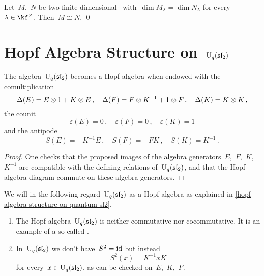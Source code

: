 \documentclass[a4paper, 11pt, oneside]{scrartcl}
\begin{document}
\begin{corollary}
  \label{decomposition from quantum weight spaces}
  Let~$M$,~$N$ be two finite-dimensional~ with~$\dim M_\lambda = \dim N_\lambda$ for every~$\lambda \in \kf^\times$.
  Then~$M \cong N$.
  \qed
\end{corollary}





\section{Hopf Algebra Structure on~$\operatorname{U}_q(\mathfrak{sl}_2)$}


\begin{proposition}
  \label{hopf algebra structure on quantum sl2}
  The algebra~$\operatorname{U}_q(\mathfrak{sl}_2)$ becomes a Hopf algebra when endowed with the comultiplication
  \[
    \Delta(E) = E \otimes 1 + K \otimes E \,,
    \quad
    \Delta(F) = F \otimes K^{-1} + 1 \otimes F \,,
    \quad
    \Delta(K) = K \otimes K \,,
  \]
  the counit
  \[
    \varepsilon(E) = 0 \,,
    \quad
    \varepsilon(F) = 0 \,,
    \quad
    \varepsilon(K) = 1
  \]
  and the antipode
  \[
    S(E) = -K^{-1} E \,,
    \quad
    S(F) = - F K \,,
    \quad
    S(K) =  K^{-1} \,.
  \]
\end{proposition}

\begin{proof}
  One checks that the proposed images of the algebra generators~$E$,~$F$,~$K$,~$K^{-1}$ are compatible with the defining relations of~$\operatorname{U}_q(\mathfrak{sl}_2)$, and that the Hopf algebra diagram commute on these algebra generators.
\end{proof}

\begin{convention}
  We will in the following regard~$\operatorname{U}_q(\mathfrak{sl}_2)$ as a Hopf algebra as explained in \cref{hopf algebra structure on quantum sl2}.
\end{convention}

\begin{remark}
  \leavevmode
  \begin{enumerate}
    \item
      The Hopf algebra~$\operatorname{U}_q(\mathfrak{sl}_2)$ is neither commutative nor cocommutative.
      It is an example of a so-called .
    \item
      In~$\operatorname{U}_q(\mathfrak{sl}_2)$ we don’t have~$S^2 = \mathrm{id}$ but instead
      \[
        S^2(x) = K^{-1} x K
      \]
      for every~$x \in \operatorname{U}_q(\mathfrak{sl}_2)$, as can be checked on~$E$,~$K$,~$F$.
  \end{enumerate}
\end{remark}
\end{document}
